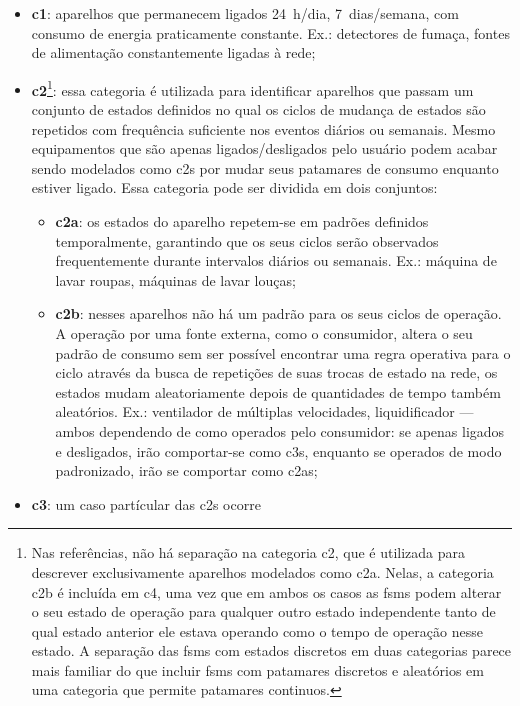 \begin{itemize}
\item \textbf{\Gls{c1}}: aparelhos que permanecem
ligados 24~h/dia, 7~dias/semana, com consumo de energia praticamente
constante. Ex.: detectores de fumaça, fontes de alimentação
constantemente ligadas à rede;
\item \textbf{\gls{c2}}\footnote{Nas referências, não há separação na
categoria \gls{c2}, que é utilizada para descrever exclusivamente
aparelhos modelados como \acs{c2a}. Nelas, a categoria
\acs{c2b} é incluída em \acs{c4}, uma vez que em ambos os
casos as \glspl{fsm} podem alterar o seu estado de operação para
qualquer outro estado independente tanto de qual estado anterior ele estava
operando como o tempo de operação nesse estado. A separação das
\glspl{fsm} com estados discretos em duas categorias parece mais
familiar do que incluir \glspl{fsm} com patamares discretos e
aleatórios em uma categoria que permite patamares
continuos.\label{fn:subdivisao}}: essa categoria é utilizada
para identificar aparelhos que passam um conjunto de estados definidos
no qual os ciclos de mudança de estados são repetidos com frequência
suficiente nos eventos diários ou semanais. Mesmo equipamentos que são
apenas ligados/desligados pelo usuário podem acabar sendo modelados
como \glspl{c2} por mudar seus patamares de consumo enquanto estiver
ligado. Essa categoria pode ser dividida em dois conjuntos:
\begin{itemize}
\item \textbf{\gls{c2a}}: os estados do aparelho repetem-se em
padrões definidos temporalmente, garantindo que os seus ciclos serão
observados frequentemente durante intervalos diários ou semanais. Ex.:
máquina de lavar roupas, máquinas de lavar louças;
\item \textbf{\gls{c2b}}: nesses aparelhos não há
um padrão para os seus ciclos de operação. A operação por uma fonte
externa, como o consumidor, altera o seu padrão de consumo sem ser
possível encontrar uma regra operativa para o ciclo através da busca
de repetições de suas trocas de estado na rede, os estados mudam
aleatoriamente depois de quantidades de tempo também aleatórios. Ex.:
ventilador de múltiplas velocidades, liquidificador --- ambos
dependendo de como operados pelo consumidor: se apenas ligados e
desligados, irão comportar-se como \acs{c3}s, enquanto se
operados de modo padronizado, irão se comportar como \acs{c2a}s;
\end{itemize}
\item \textbf{\gls{c3}}: um caso partícular das \glspl{c2} ocorre

\end{itemize}
